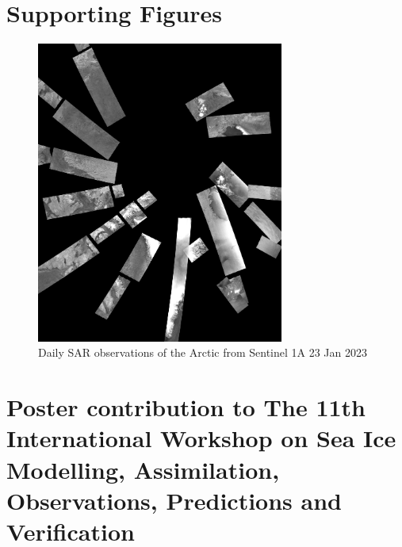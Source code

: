 \documentclass[../main/thesis.tex]{subfiles}
\begin{document}
\section{Supporting Figures}

\begin{figure}[h]
    \centering
    \includegraphics[width=0.725\textwidth]{dailysar}
    \caption{\label{fig:S-sar}Daily SAR observations of the Arctic from Sentinel 1A 23 Jan 2023}
\end{figure}

\section{Poster contribution to The 11th International Workshop on Sea Ice Modelling, Assimilation, Observations, Predictions and Verification}


\end{document}
